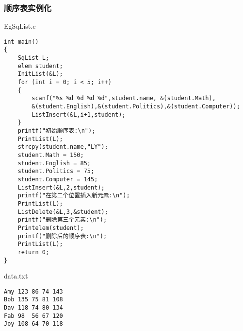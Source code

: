 \subsubsection{顺序表实例化}
\begin{macbox}{EgSqList.c}
    \begin{verbatim}
int main()
{
    SqList L;
    elem student;
    InitList(&L);
    for (int i = 0; i < 5; i++)
    {
        scanf("%s %d %d %d %d",student.name, &(student.Math), 
        &(student.English),&(student.Politics),&(student.Computer));
        ListInsert(&L,i+1,student);
    }
    printf("初始顺序表:\n");
    PrintList(L);
    strcpy(student.name,"LY");
    student.Math = 150;
    student.English = 85;
    student.Politics = 75;
    student.Computer = 145;
    ListInsert(&L,2,student);
    printf("在第二个位置插入新元素:\n");
    PrintList(L);
    ListDelete(&L,3,&student);
    printf("删除第三个元素:\n");
    Printelem(student);
    printf("删除后的顺序表:\n");
    PrintList(L);
    return 0;
}
    \end{verbatim}
\end{macbox}

\begin{macbox}{data.txt}
    \begin{verbatim}
Amy 123 86 74 143
Bob 135 75 81 108
Dav 118 74 80 134
Fab 98  56 67 120
Joy 108 64 70 118
    \end{verbatim}
\end{macbox}

